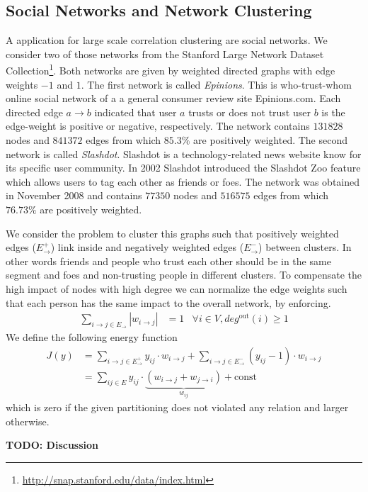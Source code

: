 \documentclass[10pt,twocolumn,letterpaper]{article}
\begin{document}
\subsection{Social Networks and Network Clustering}
A application for large scale correlation clustering are social networks.
We consider two of those networks from the Stanford Large Network Dataset Collection\footnote{\url{http://snap.stanford.edu/data/index.html}}.
Both networks are given by weighted directed graphs with edge weights $-1$ and $1$. 
%
The first network is called \emph{Epinions}. 
This is who-trust-whom online social network of a a general consumer review site Epinions.com. 
Each directed edge $a\to b$ indicated that user $a$ trusts  or does not trust user $b$ is the edge-weight is positive or negative, respectively.
The network contains $131828$ nodes and $841372$ edges from which $85.3\%$ are positively weighted.
%
The second network is called \emph{Slashdot}. 
Slashdot is a technology-related news website know for its specific user community. 
In 2002 Slashdot introduced the Slashdot Zoo feature which allows users to tag each other as friends or foes. 
The network was obtained in November 2008 and contains $77350$ nodes and $516575$ edges from which $76.73\%$ are positively weighted.

We consider the problem to cluster this graphs such that positively weighted edges ($E^+_{\to}$) link inside and negatively weighted edges ($E^-_{\to}$) between clusters.
In other words friends and people who trust each other should be in the same segment and foes and non-trusting people in different clusters.
% 
To compensate the high impact of nodes with high degree we can normalize the edge weights such that each person has the same impact to the overall network, by enforcing.
\begin{align}
  \sum_{i\to j \in E_{\to}} |w_{i\to j}| &= 1&\forall i\in V, deg^{\textrm{out}}(i)\geq 1 
\end{align}
We define the following energy function
\begin{align}
 J(y) &= \sum_{i\to j \in E^+_{\to}} y_{ij}\cdot w_{i \to j} +  \sum_{i\to j \in E^-_{\to}} (y_{ij}-1)\cdot w_{i \to j} \nonumber\\
      &= \sum_{ij \in E} y_{ij}\cdot \underbrace{(w_{i \to j}+w_{j \to i})}_{w_{ij}} + \textrm{const}
\end{align}
which is zero if the given partitioning does not violated any relation and larger otherwise.

{\color{red}\textbf{TODO: Discussion}}
\end{document}
